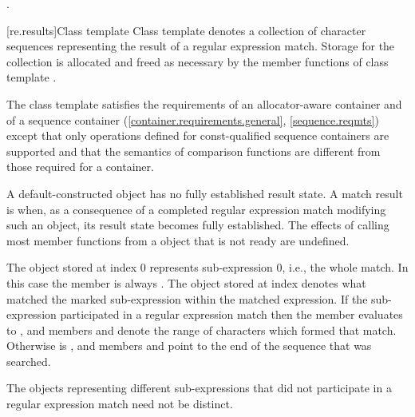 \begin{itemdescr}
\pnum\returns {}.
\end{itemdescr}

[re.results]{Class template }
\pnum
{}%
Class template  denotes a collection of character
sequences representing the result of a regular expression
match. Storage for the collection is allocated and freed as necessary
by the member functions of class template .

\pnum
{}%
%
%
The class template  satisfies the requirements of an
allocator-aware container and of a sequence container
(\ref{container.requirements.general}, \ref{sequence.reqmts})
except that only operations defined for const-qualified
sequence containers are supported and
that the semantics of comparison functions are different from those
required for a container.

\pnum
A default-constructed  object has no fully established result state. A
match result is  when, as a consequence of a completed regular expression match
modifying such an object, its result state becomes fully established. The effects of calling
most member functions from a  object that is not ready are undefined.

\pnum
{}%
The  object stored at index 0 represents sub-expression 0,
i.e., the whole match. In this case the  member
 is always . The 
object stored at index  denotes what matched the marked
sub-expression  within the matched expression. If the
sub-expression  participated in a regular expression
match then the  member  evaluates to , and
members  and  denote the range of characters
 which formed that
match. Otherwise  is , and members 
and  point to the end of the sequence
that was searched. \begin{note} The  objects representing
different sub-expressions that did not participate in a regular expression
match need not be distinct.\end{note}

